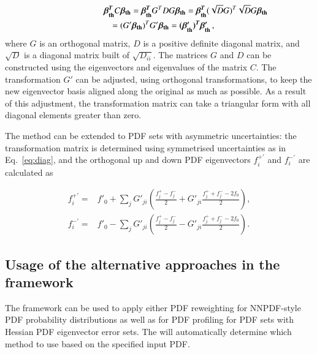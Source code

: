 \begin{eqnarray}
  \lefteqn{\boldsymbol{\beta_{\rm th}^T} C \boldsymbol{\beta_{\rm th}} = \boldsymbol{\beta_{\rm th}^T} G^T D G \boldsymbol{\beta_{\rm th}} = 
  \boldsymbol{\beta_{\rm th}^T} (\sqrt{D} G)^T \sqrt{D}G \boldsymbol{\beta_{\rm th}}}  \nonumber \\
&&  =  (G' \boldsymbol{\beta_{\rm th}})^T  G'\boldsymbol{\beta_{\rm th}} = \boldsymbol{(\beta'_{\rm th})^T}  \boldsymbol{\beta'_{\rm th}}\,,
\label{eq:diag}
\end{eqnarray} 
where $G$ is an orthogonal matrix, $D$ is a positive definite diagonal
matrix, and $\sqrt{D}$ is a diagonal matrix built of
$\sqrt{D_{ii}}$. The matrices $G$ and $D$ can be constructed using
the eigenvectors and eigenvalues of the matrix $C$. The transformation
$G'$ can be adjusted, using orthogonal transformations, to keep the
new eigenvector basis aligned along the original as much as
possible. As a result of this adjustment, the transformation matrix
can take a triangular form with all diagonal elements greater than
zero.

The method can be extended to PDF sets with asymmetric
uncertainties: the transformation matrix is
determined using symmetrised uncertainties as in
Eq.~\ref{eq:diag}, and the orthogonal up and down PDF eigenvectors
$f^{+'}_i$ and $f^{-'}_i$ are calculated as

\begin{small}
\begin{eqnarray}
\nonumber   f^{+'}_i =& f'_0 + \sum_j G'_{ji} \left( \frac{f^{+}_j - f^{-}_j}{2} + G'_{ji} \frac{f^{+}_j + f^{-}_j - 2 f_0}{2}\right),  \\
\nonumber   f^{-'}_i =& f'_0 - \sum_j G'_{ji} \left( \frac{f^{+}_j - f^{-}_j}{2} - G'_{ji} \frac{f^{+}_j + f^{-}_j - 2 f_0}{2}\right).  
\end{eqnarray} 
\end{small}

\subsection{Usage of the alternative approaches in the \fitter framework}
 
The \fitter framework can be used to apply either PDF reweighting for
NNPDF-style PDF probability distributions as well as for PDF profiling for PDF sets with Hessian PDF eigenvector error sets. The \fitter will automatically determine which method to use based on the specified input PDF. 

